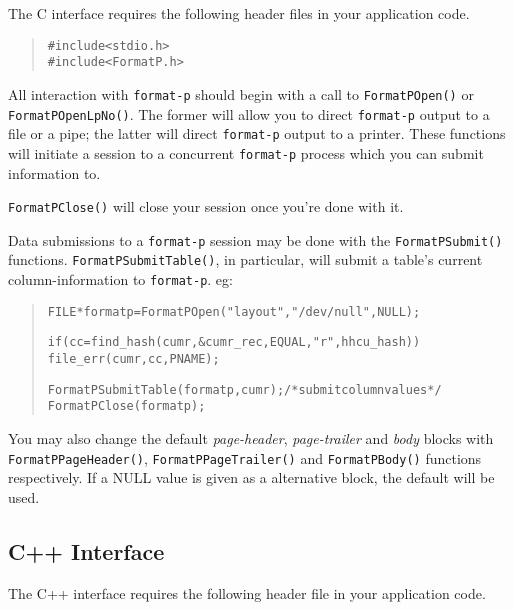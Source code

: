 \documentclass[a4paper,twoside]{article}
\begin{document}
	The C interface requires the following header files in your
	application code.

		\begin{quote}
			\begin{alltt}
			#include    <stdio.h>
			#include    <FormatP.h>
			\end{alltt}
		\end{quote}

	All interaction with \texttt{format-p} should begin with a call to
	\texttt{FormatPOpen()} or \texttt{FormatPOpenLpNo()}. The former
	will allow you to direct \texttt{format-p} output to a file or a
	pipe; the latter will direct \texttt{format-p} output to a printer.
	These functions will initiate a session to a concurrent
	\texttt{format-p} process which you can submit information to.

	\texttt{FormatPClose()} will close your session once
	you're done with it.

	Data submissions to a \texttt{format-p} session may be done with
	the \texttt{FormatPSubmit()} functions. \texttt{FormatPSubmitTable()},
	in particular, will submit a table's current column-information to
	\texttt{format-p}. eg:

		\begin{quote}
			\begin{alltt}

			FILE *  formatp = FormatPOpen ("layout", "/dev/null", NULL);

			if (cc = find_hash (cumr, &cumr_rec, EQUAL, "r", hhcu_hash))
			    file_err (cumr, cc, PNAME);

			FormatPSubmitTable (formatp, cumr); /* submit column values */
			FormatPClose (formatp);

			\end{alltt}
		\end{quote}

	You may also change the default \emph{page-header},
	\emph{page-trailer} and \emph{body} blocks with
	\texttt{FormatPPageHeader()}, \texttt{FormatPPageTrailer()} and
	\texttt{FormatPBody()} functions respectively. If a NULL value is
	given as a alternative block, the default will be used.

\subsection{C++ Interface}

	The C++ interface requires the following header file in your
	application code.
\end{document}
